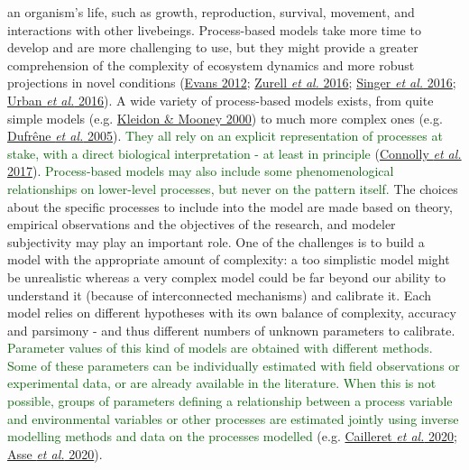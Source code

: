 \documentclass[11pt,]{article}
\begin{document}
an organism's life, such as growth, reproduction, survival, movement,
and interactions with other livebeings. Process-based models take more
time to develop and are more challenging to use, but they might provide
a greater comprehension of the complexity of ecosystem dynamics and more
robust projections in novel conditions
(\protect\hyperlink{ref-Evans2012}{Evans 2012};
\protect\hyperlink{ref-Zurell2016}{Zurell \emph{et al.} 2016};
\protect\hyperlink{ref-Singer2016}{Singer \emph{et al.} 2016};
\protect\hyperlink{ref-Urban2016}{Urban \emph{et al.} 2016}). A wide
variety of process-based models exists, from quite simple models (e.g.
\protect\hyperlink{ref-Kleidon2000}{Kleidon \& Mooney 2000}) to much
more complex ones (e.g. \protect\hyperlink{ref-Dufrene2005}{Dufrêne
\emph{et al.} 2005}).
\textcolor{darkgreen}{They all rely on an explicit representation of processes at stake, with a direct biological interpretation - at least in principle}
(\protect\hyperlink{ref-Connolly2017}{Connolly \emph{et al.} 2017}).
\textcolor{darkgreen}{Process-based models may also include some phenomenological relationships on lower-level processes, but never on the pattern itself.}
The choices about the specific processes to include into the model are
made based on theory, empirical observations and the objectives of the
research, and modeler subjectivity may play an important role. One of
the challenges is to build a model with the appropriate amount of
complexity: a too simplistic model might be unrealistic whereas a very
complex model could be far beyond our ability to understand it (because
of interconnected mechanisms) and calibrate it. Each model relies on
different hypotheses with its own balance of complexity, accuracy and
parsimony - and thus different numbers of unknown parameters to
calibrate.
\textcolor{darkgreen}{Parameter values of this kind of models are obtained with different methods. Some of these parameters can be individually estimated with field observations or experimental data, or are already available in the literature. When this is not possible, groups of parameters defining a relationship between a process variable and environmental variables or other processes are estimated jointly using inverse modelling methods and data on the processes modelled}
(e.g. \protect\hyperlink{ref-Cailleret2020}{Cailleret \emph{et al.}
2020}; \protect\hyperlink{ref-Asse2020}{Asse \emph{et al.} 2020}).
\end{document}
